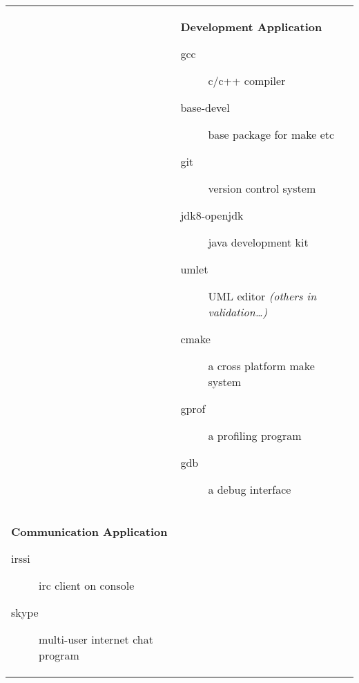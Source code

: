 \begin{tabular}{m{7cm}m{7cm}}
\begin{description}
    	\end{description}
    	&
    	\textbf{{\large Development Application}}
    	\begin{description}
    		\item[gcc] c/c++ compiler
    		\item[base-devel] base package for make etc
    		\item[git] version control system
    		\item[jdk8-openjdk] java development kit
    		\item[umlet] UML editor \textit{(others in validation\ldots)}
            \item[cmake] a cross platform make system
            \item[gprof] a profiling program
            \item[gdb] a debug interface
    	\end{description}
    	\\
    
    	\textbf{{\large Communication Application}}
    	\begin{description}
    		\item [irssi] irc client on console
    		\item [skype] multi-user internet chat program
    	\end{description}
    \end{tabular}